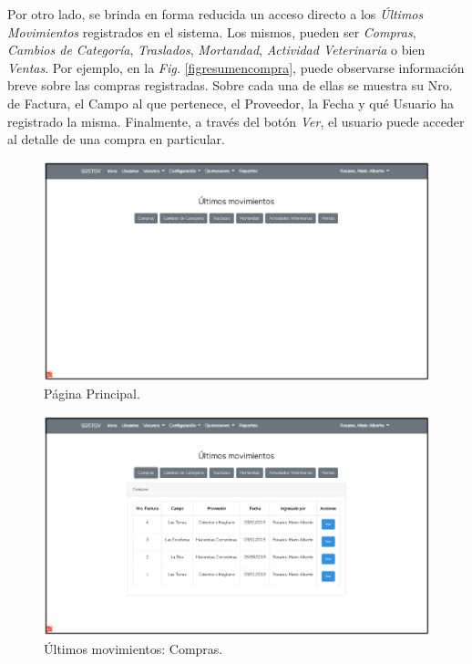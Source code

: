 \documentclass[11pt,oneside]{book}
\begin{document}
Por otro lado, se brinda en forma reducida un acceso directo a los \textit{Últimos Movimientos} registrados en el sistema. Los mismos, pueden ser \textit{Compras}, \textit{Cambios de Categoría}, \textit{Traslados}, \textit{Mortandad}, \textit{Actividad Veterinaria} o bien \textit{Ventas}. Por ejemplo, en la \textit{Fig.} \eqref{figresumencompra}, puede observarse información breve sobre las compras registradas. Sobre cada una de ellas se muestra su Nro. de Factura, el Campo al que pertenece, el Proveedor, la Fecha y qué Usuario ha registrado la misma. Finalmente, a través del botón \textit{Ver}, el usuario puede acceder al detalle de una compra en particular.
\begin{figure}[tbhp]
\centerline{\includegraphics[scale=0.87]{figs/capitulo_3_desarrollo/fig403.pdf}}
\caption{Página Principal.}
\label{fig403}
\end{figure}

\begin{figure}[tbhp]
\centerline{\includegraphics[scale=0.87]{figs/capitulo_3_desarrollo/resumen_compra.pdf}}
\caption{Últimos movimientos: Compras.}
\label{figresumencompra}
\end{figure}
\end{document}

